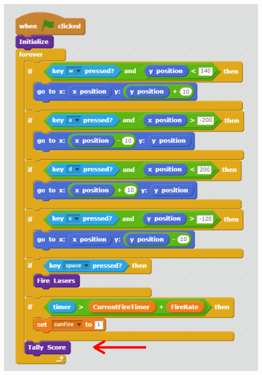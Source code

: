 \documentclass[12pt]{article}
\begin{document}
\begin{itemize}
		\begin{center}
  			\includegraphics[scale = 0.5]{./Images/XWing_GreenFlag.png}
		\end{center}
	\end{itemize}

		
	
	
\end{document}
